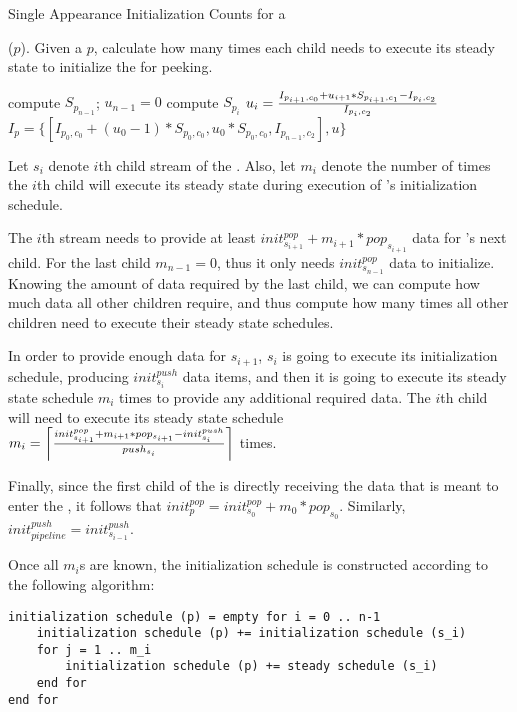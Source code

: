 \begin{algorithm}
\caption{Single Appearance Initialization Counts for a {\pipeline}}
{\bf }($p$). Given a {\pipeline} $p$, calculate how many times each
child needs to execute its steady state to initialize the
{\pipeline} for peeking.
\begin{algorithmic}
\STATE compute $S_{p_{n-1}}$; $u_{n-1} = 0$ 
\STATE compute $S_{p_i}$ \STATE $u_i = {I_{p_{i+1}, c_0} + u_{i+1}
* S_{p_{i+1}, c_1} - I_{p_i, c_2} \over I_{p_i, c_2}}$ \ENDFOR
\STATE $I_p = \{[I_{p_0, c_0} + (u_0 - 1) * S_{p_0, c_0}, u_0 *
S_{p_0, c_0}, I_{p_{n-1}, c_2}] ,u\}$
\end{algorithmic}
\end{algorithm}

Let $s_i$ denote $i$th child stream of the {\pipeline}.  Also, let
$m_i$ denote the number of times the $i$th child will execute its
steady state during execution of {\pipeline}'s initialization
schedule.

The $i$th stream needs to provide at least $init^{pop}_{s_{i+1}} +
m_{i+1} * pop_{s_{i+1}}$ data for {\pipeline}'s next child.  For the
last child $m_{n-1} = 0$, thus it only needs
$init^{pop}_{s_{n-1}}$ data to initialize.  Knowing the amount of
data required by the last child, we can compute how much data all
other children require, and thus compute how many times all other
children need to execute their steady state schedules.

In order to provide enough data for $s_{i+1}$, $s_{i}$ is going to
execute its initialization schedule, producing
$init^{push}_{s_{i}}$ data items, and then it is going to execute
its steady state schedule $m_i$ times to provide any additional
required data.  The $i$th child will need to execute its steady
state schedule $m_i = \left\lceil { init^{pop}_{s_{i+1}} + m_{i+1}
* pop_{s_{i+1}} - init^{push}_{s_i} \over{push_{s_i}}}
\right\rceil$ times.

Finally, since the first child of the {\pipeline} is directly
receiving the data that is meant to enter the {\pipeline}, it
follows that $init^{pop}_{p} = init^{pop}_{s_0} + m_0 *
pop_{s_0}$. Similarly, $init^{push}_{pipeline} =
init^{push}_{s_{i-1}}$.

Once all $m_i$s are known, the initialization schedule is
constructed according to the following algorithm:

\begin{singlespace}
\begin{verbatim}
initialization schedule (p) = empty for i = 0 .. n-1
    initialization schedule (p) += initialization schedule (s_i)
    for j = 1 .. m_i
        initialization schedule (p) += steady schedule (s_i)
    end for
end for
\end{verbatim}
\end{singlespace}

